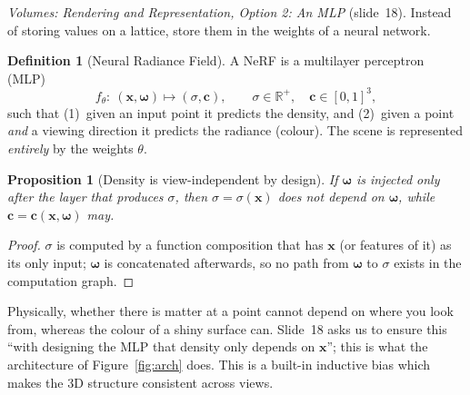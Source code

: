 \documentclass[11pt,a4paper]{article}
\newcommand{\R}{\mathbb{R}}
\newcommand{\xx}{\boldsymbol{x}}
\newcommand{\om}{\boldsymbol{\omega}}
\newcommand{\cc}{\boldsymbol{c}}
\theoremstyle{definition}
\newtheorem{definition}{Definition}[section]
\theoremstyle{plain}
\newtheorem{proposition}{Proposition}[section]
\begin{document}
\emph{Volumes: Rendering and Representation, Option 2: An MLP} (slide~18). Instead of storing values on a lattice, store them in the weights of a neural network.

\begin{definition}[Neural Radiance Field]\label{def:nerf}
A NeRF is a multilayer perceptron (MLP)
\[
f_\theta:\ (\xx,\om)\longmapsto(\sigma,\cc),\qquad \sigma\in\R^+,\quad\cc\in[0,1]^3 ,
\]
such that (1)~given an input point it predicts the density, and (2)~given a point \emph{and} a viewing direction it predicts the radiance (colour). The scene is represented \emph{entirely} by the weights $\theta$.
\end{definition}

\begin{proposition}[Density is view-independent by design]\label{prop:viewindep}
If $\om$ is injected only after the layer that produces $\sigma$, then $\sigma=\sigma(\xx)$ does not depend on $\om$, while $\cc=\cc(\xx,\om)$ may.
\end{proposition}
\begin{proof}
$\sigma$ is computed by a function composition that has $\xx$ (or features of it) as its only input; $\om$ is concatenated afterwards, so no path from $\om$ to $\sigma$ exists in the computation graph.
\end{proof}

\begin{intuition}
Physically, whether there is matter at a point cannot depend on where you look from, whereas the colour of a shiny surface can. Slide~18 asks us to ensure this ``with designing the MLP that density only depends on $\xx$''; this is what the architecture of Figure~\ref{fig:arch} does. This is a built-in inductive bias which makes the 3D structure consistent across views.
\end{intuition}
\end{document}
